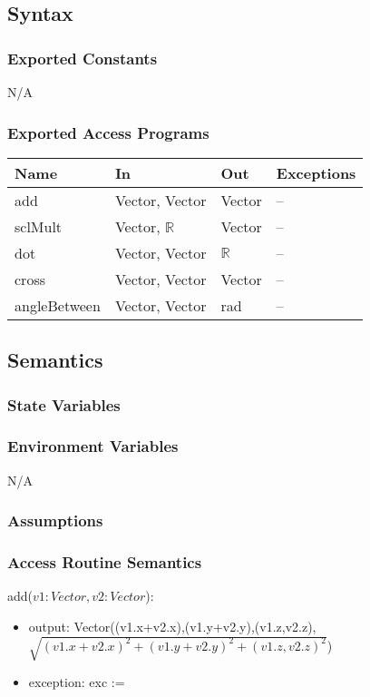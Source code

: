 \documentclass[12pt, titlepage]{article}
\begin{document}
\subsection{Syntax}
\subsubsection{Exported Constants}
N/A
\subsubsection{Exported Access Programs}
\begin{center}
	\begin{tabular}{p{3cm} p{4cm} p{2cm} p{4cm}}
		\hline
		\textbf{Name} & \textbf{In} & \textbf{Out} & \textbf{Exceptions} \\
		\hline
		add & Vector, Vector & Vector & -- \\
		sclMult & Vector, $\mathbb{R}$ & Vector & -- \\ 
		dot & Vector, Vector & $\mathbb{R}$ & -- \\
		cross & Vector, Vector & Vector & -- \\
		angleBetween & Vector, Vector & rad & -- \\
		\hline
	\end{tabular}
\end{center}

\subsection{Semantics}
\subsubsection{State Variables}

\subsubsection{Environment Variables}
N/A

\subsubsection{Assumptions}

\subsubsection{Access Routine Semantics}
\noindent add($v1:Vector, v2:Vector$):
\begin{itemize}
	\item output: 
	Vector((v1.x+v2.x),(v1.y+v2.y),(v1.z,v2.z), \\
	$\sqrt{(v1.x+v2.x)^2+(v1.y+v2.y)^2+(v1.z,v2.z)^2}$)
	\item exception: exc := \\
\end{itemize} 
\end{document}
